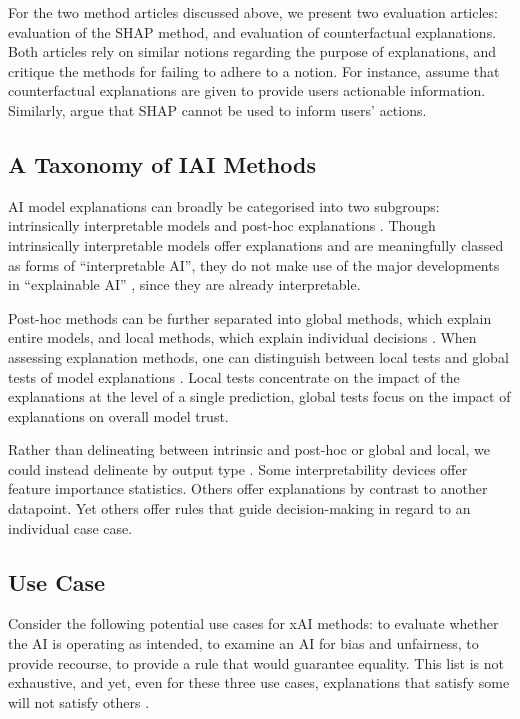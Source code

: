 For the two method articles discussed above, we present two evaluation articles: \textcite{kumar_problems_2020} evaluation of the SHAP method, and \textcite{barocas_hidden_2020} evaluation of counterfactual explanations. Both articles rely on similar notions regarding the purpose of explanations, and critique the methods for failing to adhere to a notion. For instance, \textcite{barocas_hidden_2020} assume that counterfactual explanations are given to provide users actionable information. Similarly, \textcite{kumar_problems_2020} argue that SHAP cannot be used to inform users' actions.

\subsection{A Taxonomy of IAI Methods}
AI model explanations can broadly be categorised into two subgroups: intrinsically interpretable models and post-hoc explanations \cite{molnar_interpretable_2019}. Though intrinsically interpretable models offer explanations and are meaningfully classed as forms of “interpretable AI”, they do not make use of the major developments in “explainable AI” \cite{molnar_interpretable_2019}, since they are already interpretable.

Post-hoc methods can be further separated into global methods, which explain entire models, and local methods, which explain individual decisions \cite{molnar_interpretable_2019}. When assessing explanation methods, one can distinguish between local tests and global tests of model explanations \cite{molnar_interpretable_2019}. Local tests concentrate on the impact of the explanations at the level of a single prediction, global tests focus on the impact of explanations on overall model trust.

Rather than delineating between intrinsic and post-hoc or global and local, we could instead delineate by output type \cite{friedrich_taxonomy_2011}. Some interpretability devices offer feature importance statistics. Others offer explanations by contrast to another datapoint. Yet others offer rules that guide decision-making in regard to an individual case case.

\subsection{Use Case}
Consider the following potential use cases for xAI methods: to evaluate whether the AI is operating as intended, to examine an AI for bias and unfairness, to provide recourse, to provide a rule that would guarantee equality. This list is not exhaustive, and yet, even for these three use cases, explanations that satisfy some will not satisfy others \cite{natarajan_trust_2023}.

